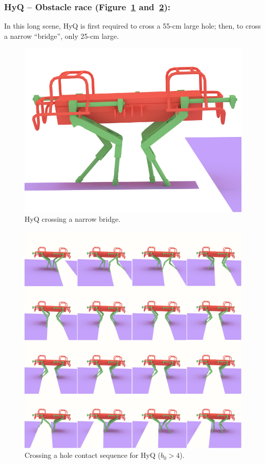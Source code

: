 \subsubsection{HyQ -- Obstacle race (Figure~\ref{fig:HyQ_bridge} and~\ref{fig:HyQ_obs}):}
In this long scene, HyQ is first required to cross a 55-cm large hole; then, to cross a narrow ``bridge'', only 25-cm large.

\begin{figure}
  \centering
  \includegraphics[width=0.4\linewidth]{figures/HyQ_bridge}
  \caption{
           HyQ crossing a narrow bridge. }
		   \label{fig:HyQ_bridge}
\end{figure}

\begin{figure}
  \centering
  \includegraphics[width=1\linewidth]{figures/HyQ_obs}
  \caption{
           Crossing a hole contact sequence for HyQ ($b_0 > 4$). }
		   \label{fig:HyQ_obs}
\end{figure}



